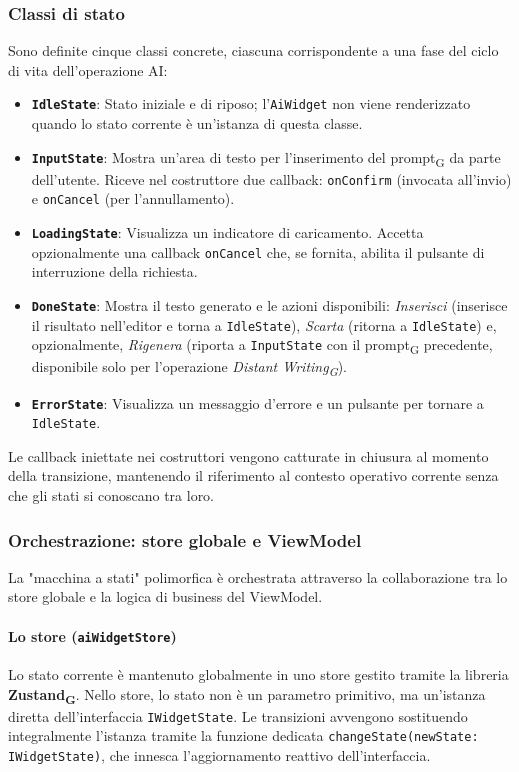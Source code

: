 \documentclass[11pt,a4paper]{article}
\newcommand{\gls}[1]{#1\textsubscript{G}}
\begin{document}
\subsubsection{Classi di stato}
Sono definite cinque classi concrete, ciascuna corrispondente a una fase del ciclo di vita dell'operazione AI:
\begin{itemize}
    \item \textbf{\texttt{IdleState}}: Stato iniziale e di riposo; l'\texttt{AiWidget} non viene renderizzato quando lo stato corrente è un'istanza di questa classe.
    \item \textbf{\texttt{InputState}}: Mostra un'area di testo per l'inserimento del \gls{prompt} da parte dell'utente. Riceve nel costruttore due callback: \texttt{onConfirm} (invocata all'invio) e \texttt{onCancel} (per l'annullamento).
    \item \textbf{\texttt{LoadingState}}: Visualizza un indicatore di caricamento. Accetta opzionalmente una callback \texttt{onCancel} che, se fornita, abilita il pulsante di interruzione della richiesta.
    \item \textbf{\texttt{DoneState}}: Mostra il testo generato e le azioni disponibili: \textit{Inserisci} (inserisce il risultato nell'editor e torna a \texttt{IdleState}), \textit{Scarta} (ritorna a \texttt{IdleState}) e, opzionalmente, \textit{Rigenera} (riporta a \texttt{InputState} con il \gls{prompt} precedente, disponibile solo per l'operazione \textit{\gls{Distant Writing}}).
    \item \textbf{\texttt{ErrorState}}: Visualizza un messaggio d'errore e un pulsante per tornare a \texttt{IdleState}.
\end{itemize}

Le callback iniettate nei costruttori vengono catturate in chiusura al momento della transizione, mantenendo il riferimento al contesto operativo corrente senza che gli stati si conoscano tra loro.


\subsubsection{Orchestrazione: store globale e ViewModel}
La "macchina a stati" polimorfica è orchestrata attraverso la collaborazione tra lo store globale e la logica di business del ViewModel.

\paragraph{Lo store (\texttt{aiWidgetStore})}
Lo stato corrente è mantenuto globalmente in uno store gestito tramite la libreria \textbf{\gls{Zustand}}. Nello store, lo stato non è un parametro primitivo, ma un'istanza diretta dell'interfaccia \texttt{IWidgetState}. Le transizioni avvengono sostituendo integralmente l'istanza tramite la funzione dedicata \texttt{changeState(newState: IWidgetState)}, che innesca l'aggiornamento reattivo dell'interfaccia.
\end{document}

